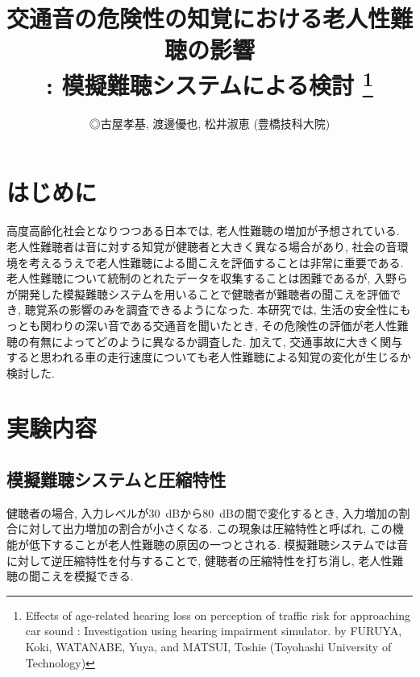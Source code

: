 \documentclass[10pt,twocolumn,uplatex,dvipdfmx]{jsarticle} %
\title{交通音の危険性の知覚における老人性難聴の影響\\ : 模擬難聴システムによる検討
\thanks{Effects of age-related hearing loss on perception of traffic risk for approaching car sound : Investigation using hearing impairment simulator.
by FURUYA, Koki, WATANABE, Yuya, and MATSUI, Toshie  (Toyohashi University of Technology)}
}
\author{◎古屋孝基, 渡邊優也, 松井淑恵 (豊橋技科大院)}
\begin{document}
\maketitle

\section{はじめに}
高度高齢化社会となりつつある日本では, 老人性難聴の増加が予想されている. 老人性難聴者は音に対する知覚が健聴者と大きく異なる場合があり, 社会の音環境を考えるうえで老人性難聴による聞こえを評価することは非常に重要である.
老人性難聴について統制のとれたデータを収集することは困難であるが, 入野らが開発した模擬難聴システムを用いることで健聴者が難聴者の聞こえを評価でき, 聴覚系の影響のみを調査できるようになった\cite{nagae2014hearing}.
本研究では, 生活の安全性にもっとも関わりの深い音である交通音を聞いたとき, その危険性の評価が老人性難聴の有無によってどのように異なるか調査した. 加えて, 交通事故に大きく関与すると思われる車の走行速度についても老人性難聴による知覚の変化が生じるか検討した.

\section{実験内容}

\subsection{模擬難聴システムと圧縮特性}

健聴者の場合, 入力レベルが30~dBから80~dBの間で変化するとき, 入力増加の割合に対して出力増加の割合が小さくなる. この現象は圧縮特性と呼ばれ, この機能が低下することが老人性難聴の原因の一つとされる. 模擬難聴システムでは音に対して逆圧縮特性を付与することで, 健聴者の圧縮特性を打ち消し, 老人性難聴の聞こえを模擬できる.
\end{document}

